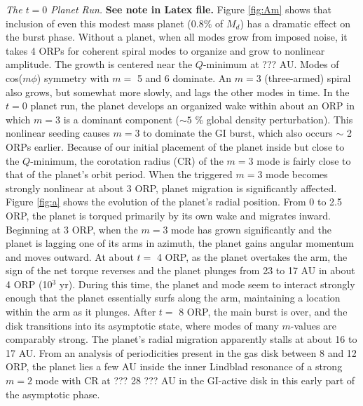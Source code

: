 \documentclass[12pt,manuscript,authoryear]{aastex}
\begin{document}
{\it The $t = 0$ Planet Run.} {\bf See note in Latex file.} Figure \ref{fig:Am} shows that inclusion of even this modest mass planet ($0.8 \%$ of $M_d$) has a dramatic effect on the burst phase. Without a planet, when all modes grow from imposed noise, it takes 4 ORPs for coherent spiral modes to organize and grow to nonlinear amplitude. The growth is centered near the $Q$-minimum at ??? AU. Modes of cos($m\phi$) symmetry with $m =$ 5 and 6 dominate. An $m = 3$ (three-armed) spiral also grows, but somewhat more slowly, and lags the other modes in time. In the $t = 0$ planet run, the planet develops an organized wake within about an ORP in which $m = 3$ is a dominant component ($\sim 5$ \% global density perturbation). This nonlinear seeding causes $m = 3$ to dominate the GI burst, which also occurs $\sim$ 2 ORPs earlier. Because of our initial placement of the planet inside but close to the $Q$-minimum, the corotation radius (CR) of the $m = 3$ mode is fairly close to that of the planet's orbit period. When the triggered $m = 3$ mode becomes strongly nonlinear at about 3 ORP, planet migration is significantly affected. Figure \ref{fig:a} shows the evolution of the planet's radial position. From 0 to 2.5 ORP, the planet is torqued primarily by its own wake and migrates inward. Beginning at 3 ORP, when the $m = 3$ mode has grown significantly and the planet is lagging one of its arms in azimuth, the planet gains angular momentum and moves outward. At about $t =$ 4 ORP, as the planet overtakes the arm, the sign of the net torque reverses and the planet plunges from 23 to 17 AU in about 4 ORP (10$^3$ yr). During this time, the planet and mode seem to interact strongly enough that the planet essentially surfs along the arm, maintaining a location within the arm as it plunges. After $t =$ 8 ORP, the main burst is over, and the disk transitions into its asymptotic state, where modes of many $m$-values are comparably strong. The planet's radial migration apparently stalls at about 16 to 17 AU. From an analysis of periodicities present in the gas disk between 8 and 12 ORP, the planet lies a few AU inside the inner Lindblad resonance of a strong $m = 2$ mode with CR at ??? 28 ??? AU in the GI-active disk in this early part of the asymptotic phase. 
\end{document}
